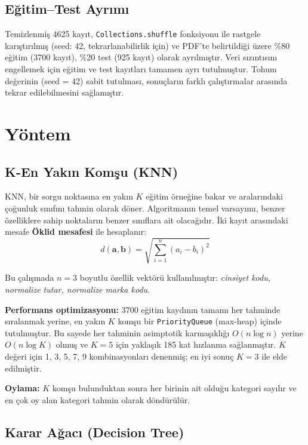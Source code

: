 \documentclass[conference]{IEEEtran}
\begin{document}
\subsection{Eğitim--Test Ayrımı}

Temizlenmiş 4625 kayıt, \texttt{Collections.shuffle} fonksiyonu ile rastgele karıştırılmış (seed: 42, tekrarlanabilirlik için) ve PDF'te belirtildiği üzere \%80 eğitim (3700 kayıt), \%20 test (925 kayıt) olarak ayrılmıştır. Veri sızıntısını engellemek için eğitim ve test kayıtları tamamen ayrı tutulmuştur. Tohum değerinin (seed = 42) sabit tutulması, sonuçların farklı çalıştırmalar arasında tekrar edilebilmesini sağlamıştır.

\section{Yöntem}

\subsection{K-En Yakın Komşu (KNN)}

KNN, bir sorgu noktasına en yakın $K$ eğitim örneğine bakar ve aralarındaki çoğunluk sınıfını tahmin olarak döner. Algoritmanın temel varsayımı, benzer özelliklere sahip noktaların benzer sınıflara ait olacağıdır. İki kayıt arasındaki mesafe \textbf{Öklid mesafesi} ile hesaplanır:
\begin{equation}
d(\mathbf{a}, \mathbf{b}) = \sqrt{\sum_{i=1}^{n}(a_i - b_i)^2}
\end{equation}

Bu çalışmada $n = 3$ boyutlu özellik vektörü kullanılmıştır: \emph{cinsiyet kodu, normalize tutar, normalize marka kodu}.

\textbf{Performans optimizasyonu:} 3700 eğitim kaydının tamamı her tahminde sıralanmak yerine, en yakın $K$ komşu bir \texttt{PriorityQueue} (max-heap) içinde tutulmuştur. Bu sayede her tahminin asimptotik karmaşıklığı $O(n \log n)$ yerine $O(n \log K)$ olmuş ve $K=5$ için yaklaşık 185 kat hızlanma sağlanmıştır. $K$ değeri için 1, 3, 5, 7, 9 kombinasyonları denenmiş; en iyi sonuç $K=3$ ile elde edilmiştir.

\textbf{Oylama:} $K$ komşu bulunduktan sonra her birinin ait olduğu kategori sayılır ve en çok oy alan kategori tahmin olarak döndürülür.

\subsection{Karar Ağacı (Decision Tree)}
\end{document}
